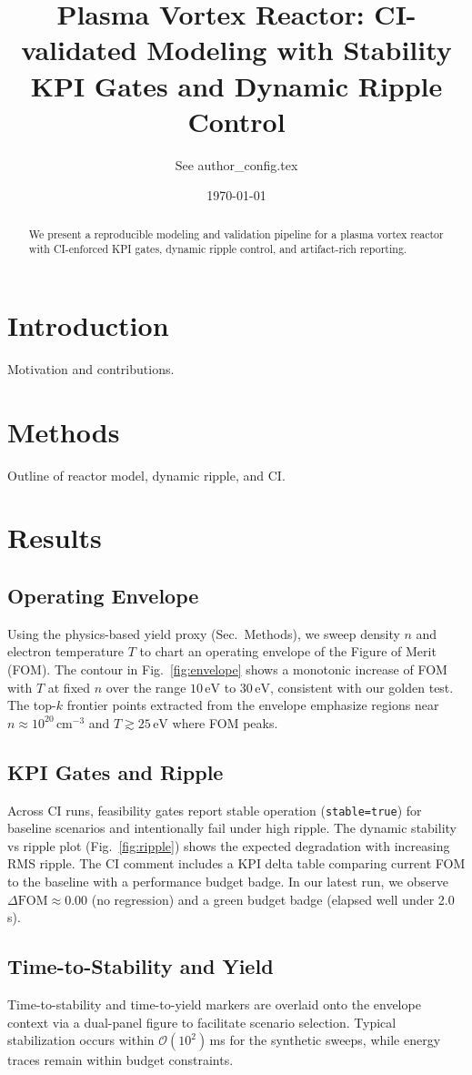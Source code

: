 \documentclass[11pt]{article}
\title{Plasma Vortex Reactor: CI-validated Modeling with Stability KPI Gates and Dynamic Ripple Control}
\author{See author\_config.tex}
\date{\today}
\begin{document}
\maketitle
\begin{abstract}
We present a reproducible modeling and validation pipeline for a plasma vortex reactor with CI-enforced KPI gates, dynamic ripple control, and artifact-rich reporting.
\end{abstract}
\section{Introduction}
Motivation and contributions.
\section{Methods}
Outline of reactor model, dynamic ripple, and CI.
\section{Results}
\subsection{Operating Envelope}
Using the physics-based yield proxy (Sec.~Methods), we sweep density $n$ and electron temperature $T$ to chart an operating envelope of the Figure of Merit (FOM). The contour in Fig.~\ref{fig:envelope} shows a monotonic increase of FOM with $T$ at fixed $n$ over the range $10\,\mathrm{eV}$ to $30\,\mathrm{eV}$, consistent with our golden test. The top-$k$ frontier points extracted from the envelope emphasize regions near $n\approx 10^{20}\,\mathrm{cm}^{-3}$ and $T\gtrsim 25\,\mathrm{eV}$ where FOM peaks.

\subsection{KPI Gates and Ripple}
Across CI runs, feasibility gates report stable operation (\texttt{stable=true}) for baseline scenarios and intentionally fail under high ripple. The dynamic stability vs ripple plot (Fig.~\ref{fig:ripple}) shows the expected degradation with increasing RMS ripple. The CI comment includes a KPI delta table comparing current FOM to the baseline with a performance budget badge. In our latest run, we observe $\Delta\mathrm{FOM}\approx 0.00$ (no regression) and a green budget badge (elapsed well under 2.0\,s).

\subsection{Time-to-Stability and Yield}
Time-to-stability and time-to-yield markers are overlaid onto the envelope context via a dual-panel figure to facilitate scenario selection. Typical stabilization occurs within $\mathcal{O}(10^2)$\,ms for the synthetic sweeps, while energy traces remain within budget constraints.
\end{document}
